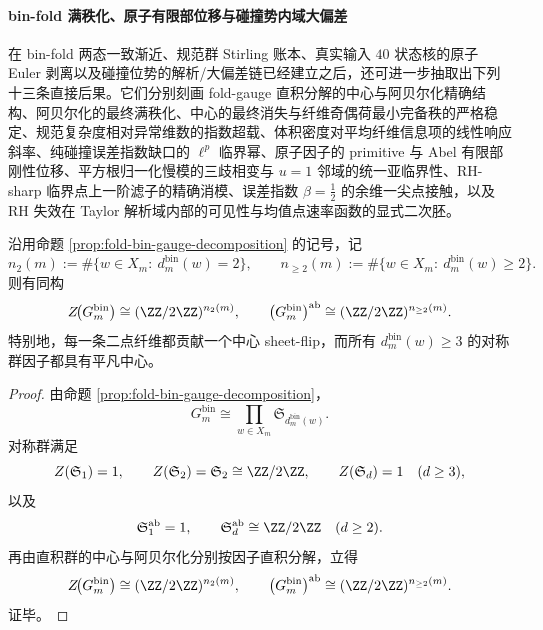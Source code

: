 \paragraph{bin-fold 满秩化、原子有限部位移与碰撞势内域大偏差}
在 bin-fold 两态一致渐近、规范群 Stirling 账本、真实输入 \(40\) 状态核的原子 Euler 剥离以及碰撞位势的解析/大偏差链已经建立之后，还可进一步抽取出下列十三条直接后果。它们分别刻画 fold-gauge 直积分解的中心与阿贝尔化精确结构、阿贝尔化的最终满秩化、中心的最终消失与纤维奇偶荷最小完备秩的严格稳定、规范复杂度相对异常维数的指数超载、体积密度对平均纤维信息项的线性响应斜率、纯碰撞误差指数缺口的 \(\ell^p\) 临界幂、原子因子的 primitive 与 Abel 有限部刚性位移、平方根归一化慢模的三歧相变与 \(u=1\) 邻域的统一亚临界性、RH-sharp 临界点上一阶滤子的精确消模、误差指数 \(\beta=\tfrac12\) 的余维一尖点接触，以及 RH 失效在 Taylor 解析域内部的可见性与均值点速率函数的显式二次胚。

\begin{theorem}\label{thm:xi-time-part65-binfold-gauge-center-abelianization-exact}
沿用命题 \ref{prop:fold-bin-gauge-decomposition} 的记号，记
\[
n_2(m):=\#\{w\in X_m:\ d_m^{\mathrm{bin}}(w)=2\},
\qquad
n_{\ge 2}(m):=\#\{w\in X_m:\ d_m^{\mathrm{bin}}(w)\ge 2\}.
\]
则有同构
\[
Z\!\bigl(G_m^{\mathrm{bin}}\bigr)\cong (\ZZ/2\ZZ)^{n_2(m)},
\qquad
\bigl(G_m^{\mathrm{bin}}\bigr)^{\mathrm{ab}}\cong (\ZZ/2\ZZ)^{n_{\ge 2}(m)}.
\]
特别地，每一条二点纤维都贡献一个中心 sheet-flip，而所有 \(d_m^{\mathrm{bin}}(w)\ge 3\) 的对称群因子都具有平凡中心。
\end{theorem}
\begin{proof}
由命题 \ref{prop:fold-bin-gauge-decomposition}，
\[
G_m^{\mathrm{bin}}
\cong
\prod_{w\in X_m}\mathfrak S_{d_m^{\mathrm{bin}}(w)}.
\]
对称群满足
\[
Z(\mathfrak S_1)=1,
\qquad
Z(\mathfrak S_2)=\mathfrak S_2\cong \ZZ/2\ZZ,
\qquad
Z(\mathfrak S_d)=1\quad(d\ge 3),
\]
以及
\[
\mathfrak S_1^{\mathrm{ab}}=1,
\qquad
\mathfrak S_d^{\mathrm{ab}}\cong \ZZ/2\ZZ\quad(d\ge 2).
\]
再由直积群的中心与阿贝尔化分别按因子直积分解，立得
\[
Z\!\bigl(G_m^{\mathrm{bin}}\bigr)\cong (\ZZ/2\ZZ)^{n_2(m)},
\qquad
\bigl(G_m^{\mathrm{bin}}\bigr)^{\mathrm{ab}}\cong (\ZZ/2\ZZ)^{n_{\ge 2}(m)}.
\]
证毕。
\end{proof}


